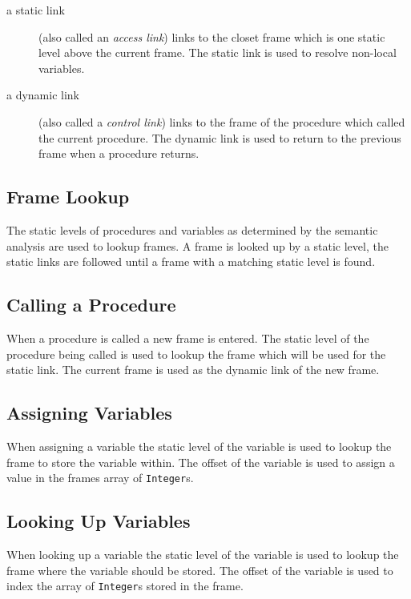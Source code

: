 \documentclass[a4paper,twoside,twocolumn]{article}
\begin{document}
\begin{description}
\item[a static link] (also called an \emph{access link}) links to the closet
frame which is one static level above the current frame. The static link
is used to resolve non-local variables.

\item[a dynamic link] (also called a \emph{control link}) links to the frame
of the procedure which called the current procedure. The dynamic link
is used to return to the previous frame when a procedure returns.
\end{description}

\subsection{Frame Lookup}\label{section:lookup}
The static levels of procedures and variables as determined by the semantic
analysis are used to lookup frames. A frame is looked up by a static level,
the static links are followed until a frame with a matching static level is
found.

\subsection{Calling a Procedure}\label{section:call}
When a procedure is called a new frame is entered. The static level of the
procedure being called is used to lookup the frame which will be used for the
static link. The current frame is used as the dynamic link of the new frame.

\subsection{Assigning Variables}\label{section:assignment}
When assigning a variable the static level of the variable is used to lookup
the frame to store the variable within. The offset of the variable is used
to assign a value in the frames array of \texttt{Integer}s.

\subsection{Looking Up Variables}\label{section:lookup}
When looking up a variable the static level of the variable is used to lookup
the frame where the variable should be stored. The offset of the variable is
used to index the array of \texttt{Integer}s stored in the frame.
\end{document}
